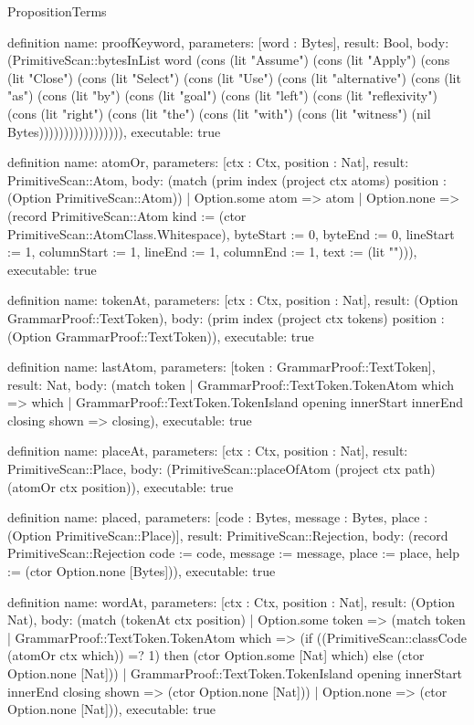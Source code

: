 \begin{lexlean}{PropositionTerms}
\begin{semanticmodule}
definition{
  name: proofKeyword,
  parameters: [word : Bytes],
  result: Bool,
  body: (PrimitiveScan::bytesInList word (cons (lit "Assume") (cons (lit "Apply") (cons (lit "Close") (cons (lit "Select") (cons (lit "Use") (cons (lit "alternative") (cons (lit "as") (cons (lit "by") (cons (lit "goal") (cons (lit "left") (cons (lit "reflexivity") (cons (lit "right") (cons (lit "the") (cons (lit "with") (cons (lit "witness") (nil Bytes))))))))))))))))),
  executable: true
}

definition{
  name: atomOr,
  parameters: [ctx : Ctx, position : Nat],
  result: PrimitiveScan::Atom,
  body: (match (prim index (project ctx atoms) position : (Option PrimitiveScan::Atom))
    | Option.some atom => atom
    | Option.none => (record PrimitiveScan::Atom {kind := (ctor PrimitiveScan::AtomClass.Whitespace), byteStart := 0, byteEnd := 0, lineStart := 1, columnStart := 1, lineEnd := 1, columnEnd := 1, text := (lit "")})),
  executable: true
}

definition{
  name: tokenAt,
  parameters: [ctx : Ctx, position : Nat],
  result: (Option GrammarProof::TextToken),
  body: (prim index (project ctx tokens) position : (Option GrammarProof::TextToken)),
  executable: true
}

definition{
  name: lastAtom,
  parameters: [token : GrammarProof::TextToken],
  result: Nat,
  body: (match token
    | GrammarProof::TextToken.TokenAtom which => which
    | GrammarProof::TextToken.TokenIsland opening innerStart innerEnd closing shown => closing),
  executable: true
}

definition{
  name: placeAt,
  parameters: [ctx : Ctx, position : Nat],
  result: PrimitiveScan::Place,
  body: (PrimitiveScan::placeOfAtom (project ctx path) (atomOr ctx position)),
  executable: true
}

definition{
  name: placed,
  parameters: [code : Bytes, message : Bytes, place : (Option PrimitiveScan::Place)],
  result: PrimitiveScan::Rejection,
  body: (record PrimitiveScan::Rejection {code := code, message := message, place := place, help := (ctor Option.none [Bytes])}),
  executable: true
}

definition{
  name: wordAt,
  parameters: [ctx : Ctx, position : Nat],
  result: (Option Nat),
  body: (match (tokenAt ctx position)
    | Option.some token => (match token
      | GrammarProof::TextToken.TokenAtom which => (if ((PrimitiveScan::classCode (atomOr ctx which)) =? 1) then (ctor Option.some [Nat] which) else (ctor Option.none [Nat]))
      | GrammarProof::TextToken.TokenIsland opening innerStart innerEnd closing shown => (ctor Option.none [Nat]))
    | Option.none => (ctor Option.none [Nat])),
  executable: true
}


\end{semanticmodule}
\end{lexlean}
